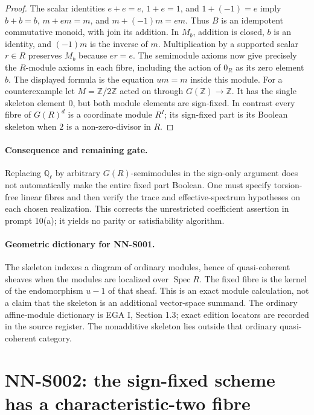 \begin{proof}
The scalar identities $e+e=e$, $1+e=1$, and $1+(-1)=e$ imply
$b+b=b$, $m+em=m$, and $m+(-1)m=em$. Thus $B$ is an idempotent
commutative monoid, with join its addition. In $M_b$, addition is closed,
$b$ is an identity, and $(-1)m$ is the inverse of $m$. Multiplication
by a supported scalar $r\in R$ preserves $M_b$ because $er=e$.
The semimodule axioms now give precisely the $R$-module axioms in
each fibre, including the action of $0_R$ as its zero element $b$.
The displayed formula is the equation $um=m$ inside this module.
For a counterexample let $M=\mathbb Z/2\mathbb Z$ acted on through
$G(\mathbb Z)\to\mathbb Z$. It has the single skeleton element $0$,
but both module elements are sign-fixed. In contrast every fibre of
$G(R)^d$ is a coordinate module $R^I$; its sign-fixed part is its
Boolean skeleton when $2$ is a non-zero-divisor in $R$.
\end{proof}

\paragraph{Consequence and remaining gate.}
Replacing $\mathbb Q_\ell$ by arbitrary $G(R)$-semimodules in the
sign-only argument does not automatically make the entire fixed part
Boolean. One must specify torsion-free linear fibres and then verify
the trace and effective-spectrum hypotheses on each chosen realization.
This corrects the unrestricted coefficient assertion in prompt 10(a);
it yields no parity or satisfiability algorithm.

\paragraph{Geometric dictionary for NN-S001.}
The skeleton indexes a diagram of ordinary modules, hence of
quasi-coherent sheaves when the modules are localized over $\operatorname{Spec}R$.
The fixed fibre is the kernel of the endomorphism $u-1$ of that sheaf.
This is an exact module calculation, not a claim that the skeleton is
an additional vector-space summand. The ordinary affine-module
dictionary is EGA I, Section 1.3; exact edition locators are recorded
in the source register. The nonadditive skeleton lies outside that
ordinary quasi-coherent category.



\section{NN-S002: the sign-fixed scheme has a characteristic-two fibre}
\label{sec:NN-S002}

